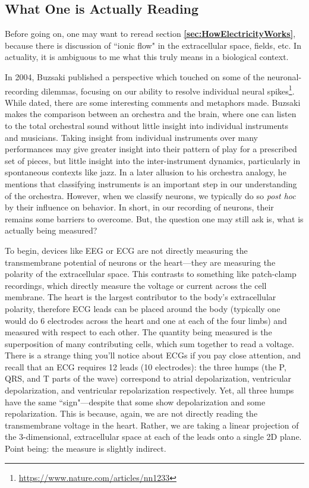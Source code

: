 \subsection{What One is Actually Reading}

\label{sec:WhatOneReads}
Before going on, one may want to reread section \textbf{\ref{sec:HowElectricityWorks}}, because there is discussion of ``ionic flow" in the extracellular space, fields, etc. In actuality, it is ambiguous to me what this truly means in a biological context. \newline
   
In 2004, Buzsaki published a perspective which touched on some of the neuronal-recording dilemmas, focusing on our ability to resolve individual neural spikes\footnote{\url{https://www.nature.com/articles/nn1233}}. While dated, there are some interesting comments and metaphors made. Buzsaki makes the comparison between an orchestra and the brain, where one can listen to the total orchestral sound without little insight into individual instruments and musicians. Taking insight from individual instruments over many performances may give greater insight into their pattern of play for a prescribed set of pieces, but little insight into the inter-instrument dynamics, particularly in spontaneous contexts like jazz. In a later allusion to his orchestra analogy, he mentions that classifying instruments is an important step in our understanding of the orchestra. However, when we classify neurons, we typically do so \textit{post hoc} by their influence on behavior. In short, in our recording of neurons, their remains some barriers to overcome. But, the question one may still ask is, what is actually being measured?\newline

To begin, devices like EEG or ECG are not directly measuring the transmembrane potential of neurons or the heart---they are measuring the polarity of the extracellular space. This contrasts to something like patch-clamp recordings, which directly measure the voltage or current across the cell membrane. The heart is the largest contributor to the body's extracellular polarity, therefore ECG leads can be placed around the body (typically one would do 6 electrodes across the heart and one at each of the four limbs) and measured with respect to each other. The quantity being measured is the superposition of many contributing cells, which sum together to read a voltage. There is a strange thing you'll notice about ECGs if you pay close attention, and recall that an ECG requires 12 leads (10 electrodes): the three humps (the P, QRS, and T parts of the wave) correspond to atrial depolarization, ventricular depolarization, and ventricular repolarization respectively. Yet, all three humps have the same ``sign"---despite that some show depolarization and some repolarization. This is because, again, we are not directly reading the transmembrane voltage in the heart. Rather, we are taking a linear projection of the 3-dimensional, extracellular space at each of the leads onto a single 2D plane. Point being: the measure is slightly indirect. \newline

